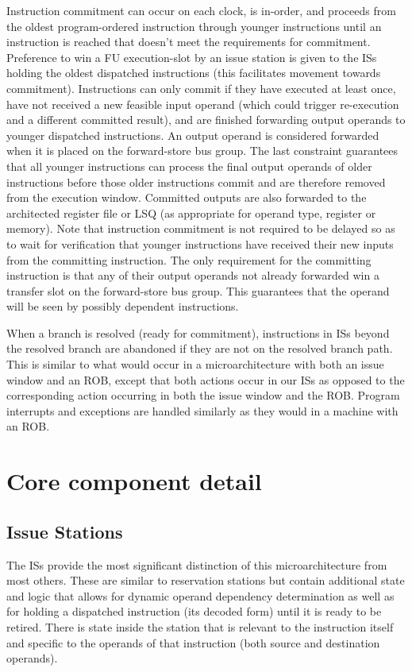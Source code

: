 \documentclass[10pt,dvips]{article}
\begin{document}
Instruction commitment can occur on each clock, is in-order, and
proceeds from the oldest program-ordered
instruction through younger instructions until an instruction
is reached that doesn't meet the requirements for commitment.
Preference to win a FU execution-slot by an issue
station is given to the ISs holding the oldest
dispatched instructions (this facilitates movement towards
commitment).
Instructions can only commit if they have executed at least once,
have not received a new feasible input operand (which could
trigger re-execution and a different committed result),
and are finished forwarding output operands 
to younger dispatched instructions.  
An output operand is considered forwarded when it is placed
on the forward-store bus group.
The last constraint guarantees that all younger
instructions can process the final output operands of older
instructions before those older instructions commit and are
therefore removed from the execution window.
Committed outputs are also forwarded to the architected register
file or LSQ (as appropriate for operand type, register or memory).
Note that instruction commitment is not required to be delayed 
so as to wait for verification that
younger instructions have received their new 
inputs from the committing instruction.
The only requirement for the committing instruction is
that any of their output operands not already forwarded win
a transfer slot on the forward-store bus group.
This
guarantees that the operand will be seen by possibly
dependent instructions.

When a branch is resolved (ready for commitment),
instructions in ISs beyond the resolved branch
are abandoned if they are not on the resolved branch path.
This is similar to what would occur in a microarchitecture
with both an issue window and an ROB, except that both actions
occur in our ISs as opposed to the corresponding
action occurring in both the issue window and the ROB.
Program interrupts and exceptions are handled similarly as they
would in a machine with an ROB.
%
\vspace{-0.15in}
\section{Core component detail}
%
\subsection{Issue Stations}
%
The ISs provide the most significant distinction of this
microarchitecture from most others.  
These are similar to reservation stations
but contain additional state and logic that allows
for dynamic operand dependency determination as well as
for holding a dispatched instruction (its decoded form) 
until it is ready to be retired.  
There is state inside the station that is relevant to
the instruction itself and specific
to the operands of that instruction (both source and
destination operands).
\end{document}
